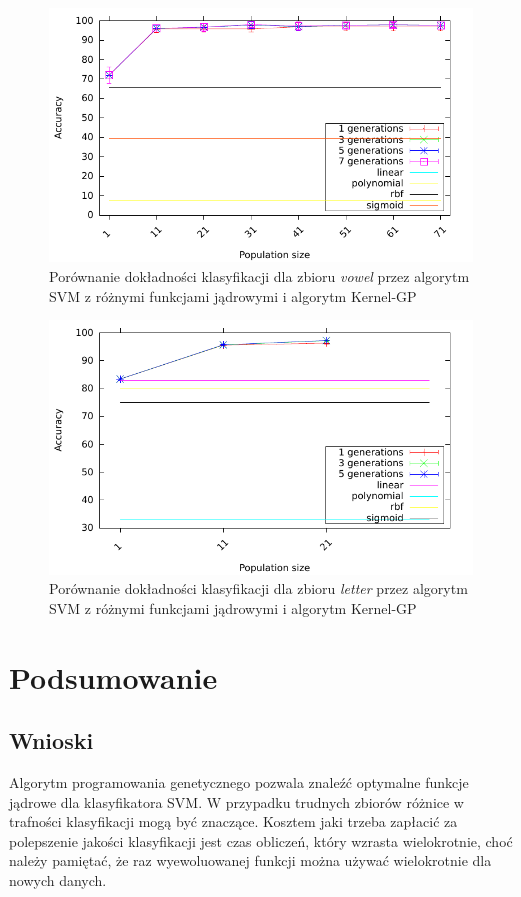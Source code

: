 \documentclass{article}
\begin{document}
		\begin{figure}[ht]
		\includegraphics[scale=0.90]{figures/accuracy-vowel-svm}
		\caption{Porównanie dokładności klasyfikacji dla zbioru \emph{vowel} przez algorytm SVM z różnymi funkcjami jądrowymi i algorytm Kernel-GP\label{fig:acc-vowel-svm}}
	\end{figure}
	
		\begin{figure}[ht]
		\includegraphics[scale=0.90]{figures/accuracy-letter-svm}
		\caption{Porównanie dokładności klasyfikacji dla zbioru \emph{letter} przez algorytm SVM z różnymi funkcjami jądrowymi i algorytm Kernel-GP\label{fig:acc-letter-svm}}
	\end{figure}		
		
		
\section{Podsumowanie}
	\subsection{Wnioski}
		Algorytm programowania genetycznego pozwala znaleźć optymalne funkcje jądrowe dla klasyfikatora SVM. W przypadku trudnych zbiorów różnice w trafności klasyfikacji mogą być znaczące. Kosztem jaki trzeba zapłacić za polepszenie jakości klasyfikacji jest czas obliczeń, który wzrasta wielokrotnie, choć należy pamiętać, że raz wyewoluowanej funkcji można używać wielokrotnie dla nowych danych.
		
\end{document}
